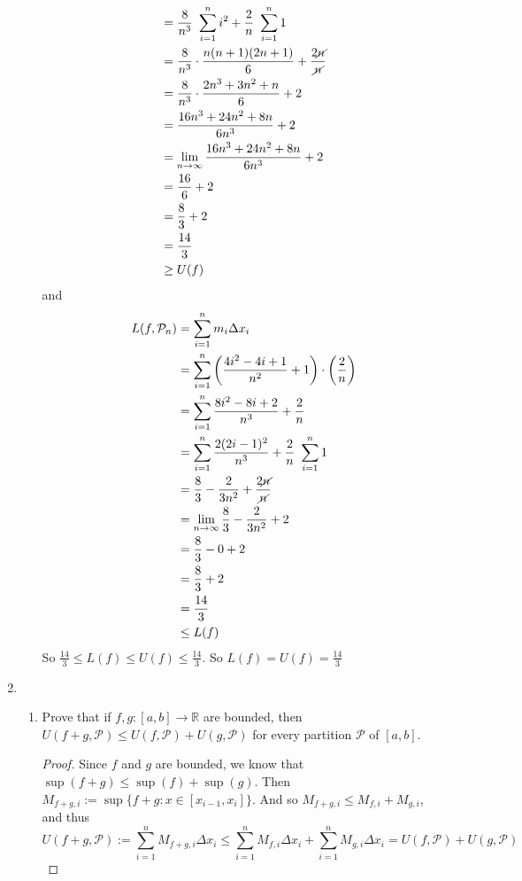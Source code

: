 \documentclass[12pt,letterpaper]{article}
\newcommand{\R}{\mathbb{R}}
\theoremstyle{case}
\theoremstyle{definition}
\begin{document}
\begin{enumerate}
\begin{enumerate}
\begin{align*}
				&= \frac{8}{n^3}\ \sum_{i=1}^{n} i^2 + \frac{2}{n}\ \sum_{i=1}^{n} 1 \\
				&= \frac{8}{n^3} \cdot \frac{n(n+1)(2n+1)}{6} + \frac{2 \cancel{n}}{\cancel{n}} \\
				&= \frac{8}{n^3} \cdot \frac{2n^3+3n^2+n}{6} + 2 \\
				&= \frac{16n^3+24n^2+8n}{6n^3} + 2 \\
				&= \lim\limits_{n \to \infty}\frac{16n^3+24n^2+8n}{6n^3} + 2 \\
				&= \frac{16}{6} + 2 \\
				&= \frac{8}{3} + 2 \\
				&= \frac{14}{3} \\
				&\geq U(f)
			\end{align*}
			and
			\begin{align*}
				L(f,\mathcal{P}_n) &= \sum_{i=1}^{n} m_i \Delta x_i \\
				&= \sum_{i=1}^{n} \left(\frac{4i^2-4i+1}{n^2}+1\right) \cdot \left(\frac{2}{n}\right) \\
				&= \sum_{i=1}^{n} \frac{8i^2-8i+2}{n^3} + \frac{2}{n} \\
				&= \sum_{i=1}^{n} \frac{2(2i-1)^2}{n^3} + \frac{2}{n}\ \sum_{i=1}^{n} 1 \\
				&= \frac{8}{3}-\frac{2}{3n^2} + \frac{2 \cancel{n}}{\cancel{n}} \\
				&= \lim\limits_{n \to \infty} \frac{8}{3} -\frac{2}{3n^2} + 2 \\
				&= \frac{8}{3} -0 + 2 \\
				&= \frac{8}{3} + 2 \\
				&= \frac{14}{3} \\
				&\leq L(f)
			\end{align*}
			So $\frac{14}{3} \leq L(f) \leq U(f) \leq \frac{14}{3}$. So $L(f)=U(f)=\frac{14}{3}$
		\end{enumerate}
		\item
		\begin{enumerate}
			\item Prove that if $f,g:[a,b] \to \R$ are bounded, then $U(f+g, \mathcal{P}) \leq U(f,\mathcal{P})+U(g,\mathcal{P})$ for every partition $\mathcal{P}$ of $[a,b]$.
			\begin{proof}
				Since $f$ and $g$ are bounded, we know that $\sup(f+g) \leq \sup (f) + \sup(g)$. Then $M_{f+g,i}:=\sup \{f+g:x \in [x_{i-1},x_i]\}$. And so $M_{f+g,i} \leq M_{f,i} + M_{g,i}$, and thus
				\[U(f+g,\mathcal{P}):=\sum_{i=1}^{n} M_{f+g,i}\Delta x_i \leq \sum_{i=1}^{n} M_{f,i}\Delta x_i +\sum_{i=1}^{n} M_{g,i}\Delta x_i=U(f,\mathcal{P})+U(g,\mathcal{P})\]

\end{proof}
\end{enumerate}
\end{enumerate}
\end{document}
